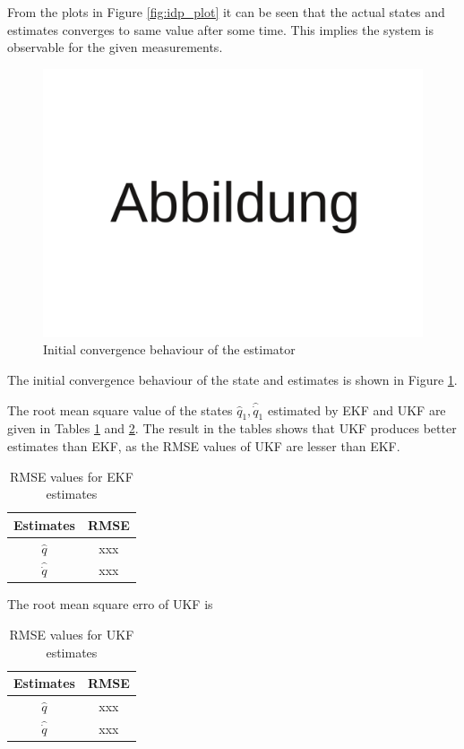 From the plots in Figure \ref{fig:idp_plot} it can be seen that the actual states and estimates converges to same value after some time. This implies the system is observable for the given measurements. 
\begin{figure}
    \centering
    \includegraphics[scale=0.1]{Bilder/Abbildung.pdf}
    \caption{ Initial convergence behaviour of the estimator }
    \label{fig:idp_init_conv}
\end{figure}
The initial convergence behaviour of the state and estimates is shown in Figure \ref{fig:idp_init_conv}.

The root mean square value of the states $\hat q_1, \hat{\dot q}_1 $ estimated by EKF and UKF are given in Tables \ref{tab:idp_rmse_ekf} and \ref{tab:idp_rmse_ukf}. The result in the tables shows that UKF produces better estimates than EKF, as the RMSE values of UKF are lesser than EKF.
\begin{table}[H]
    \centering
    \begin{tabular}{|c|c|}
    \hline
    Estimates &RMSE \\ \hline
    $\hat q$   &xxx \\ \hline
    $\hat {\dot q}$ & xxx \\ \hline
    \end{tabular}
    \caption{RMSE values for EKF estimates}
    \label{tab:idp_rmse_ekf}
\end{table}

The root mean square erro of UKF is
\begin{table}[H]
    \centering
    \begin{tabular}{|c|c|}
    \hline
    Estimates &RMSE \\ \hline
    $\hat q$   &xxx \\ \hline
    $\hat {\dot q}$ & xxx \\ \hline
    \end{tabular}
    \caption{RMSE values for UKF estimates}
    \label{tab:idp_rmse_ukf}
\end{table}


